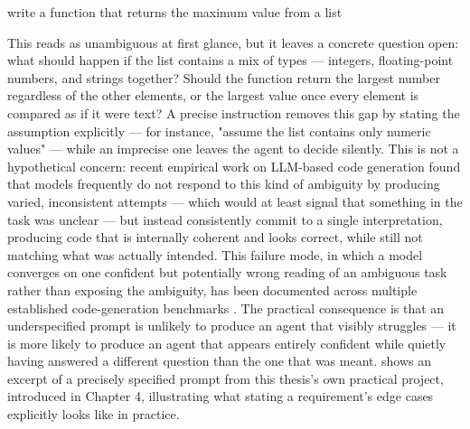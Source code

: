 \begin{listing}[H]
\begin{center}
\begin{promptbox}
write a function that returns the maximum value from a list
\end{promptbox}
\end{center}
\caption{An underspecified task instruction, used to illustrate prompt ambiguity.}
\label{lst:max-value-instruction}
\end{listing}
This reads as unambiguous at first glance, but it leaves a concrete question open: what should happen if the list contains a mix of types --- integers, floating-point numbers, and strings together? Should the function return the largest number regardless of the other elements, or the largest value once every element is compared as if it were text? A precise instruction removes this gap by stating the assumption explicitly --- for instance, "assume the list contains only numeric values" --- while an imprecise one leaves the agent to decide silently. This is not a hypothetical concern: recent empirical work on LLM-based code generation found that models frequently do not respond to this kind of ambiguity by producing varied, inconsistent attempts --- which would at least signal that something in the task was unclear --- but instead consistently commit to a single interpretation, producing code that is internally coherent and looks correct, while still not matching what was actually intended. This failure mode, in which a model converges on one confident but potentially wrong reading of an ambiguous task rather than exposing the ambiguity, has been documented across multiple established code-generation benchmarks \cite{richter2026underspecification}. The practical consequence is that an underspecified prompt is unlikely to produce an agent that visibly struggles --- it is more likely to produce an agent that appears entirely confident while quietly having answered a different question than the one that was meant.  shows an excerpt of a precisely specified prompt from this thesis's own practical project, introduced in Chapter 4, illustrating what stating a requirement's edge cases explicitly looks like in practice.

